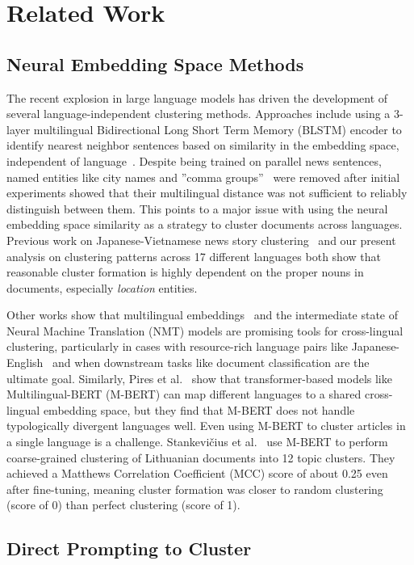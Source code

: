 \section{Related Work}\label{section:related_work}


\subsection{Neural Embedding Space Methods} 
The recent explosion in large language models has driven the development of several language-independent clustering methods. Approaches include using a 3-layer multilingual Bidirectional Long Short Term Memory (BLSTM) encoder to identify nearest neighbor sentences based on similarity in the embedding space, independent of language~\cite{Schw18}. Despite being trained on parallel news sentences, named entities like city names and ''comma groups''~\cite{Lieb10b} were removed after initial experiments showed that their multilingual distance was not sufficient to reliably distinguish between them. This points to a major issue with using the neural embedding space similarity as a strategy to cluster documents across languages. Previous work on Japanese-Vietnamese news story clustering~\cite{Hong17} and our present analysis on clustering patterns across 17 different languages both show that reasonable cluster formation is highly dependent on the proper nouns in documents, especially \emph{location} entities. 

Other works show that multilingual embeddings~\cite{Amma18} and the intermediate state of Neural Machine Translation (NMT) models are promising tools for cross-lingual clustering, particularly in cases with resource-rich language pairs like Japanese-English~\cite{Seki18} and when downstream tasks like document classification are the ultimate goal. %
Similarly, Pires et al.~\cite{Pire19} show that transformer-based models like Multilingual-BERT (M-BERT) can map different languages to a shared cross-lingual embedding space, but they find that M-BERT does not handle typologically divergent languages well.
Even using M-BERT to cluster articles in a single language is a challenge. Stankevičius et al.~\cite{Stan20} use M-BERT to perform coarse-grained clustering of Lithuanian documents into 12 topic clusters. They achieved a Matthews Correlation Coefficient (MCC) score of about 0.25 even after fine-tuning, meaning cluster formation was closer to random clustering (score of 0) than perfect clustering (score of 1).

\subsection{Direct Prompting to Cluster}